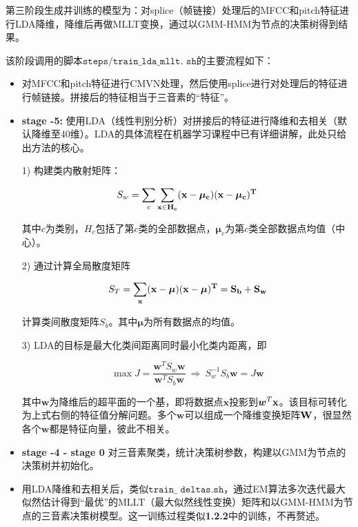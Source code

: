 \documentclass[a4paper]{article}
\renewcommand{\tt}[1]{\mathtt{#1}}
\newcommand{\bd}[1]{\boldsymbol{#1}}
\begin{document}
第三阶段生成并训练的模型为：对splice（帧链接）处理后的MFCC和pitch特征进行LDA降维，降维后再做MLLT变换，通过以GMM-HMM为节点的决策树得到结果。

\vspace{1em}
该阶段调用的脚本$\tt{steps/train\_lda\_mllt.}$ $\tt{sh}$的主要流程如下：

\begin{itemize}
    \item 对MFCC和pitch特征进行CMVN处理，然后使用splice进行对处理后的特征进行帧链接。拼接后的特征相当于三音素的“特征”。
    \item \textbf{stage -5:} 使用LDA（线性判别分析）对拼接后的特征进行降维和去相关（默认降维至40维）。LDA的具体流程在机器学习课程\cite{ML}中已有详细讲解，此处只给出方法的核心。
    
    1) 构建类内散射矩阵：
    
    \vspace{-0.5em}
    $$S_w=\sum_{c}\sum_{\bf{x}\in H_c}(\bf{x}-\bd{\mu}_c)(\bf{x}-\bd{\mu}_c)^T$$
    
    其中$c$为类别，$H_c$包括了第$c$类的全部数据点，$\bd{\mu}_c$为第$c$类全部数据点均值（中心）。
    
    2) 通过计算全局散度矩阵
    
    \vspace{-2em}
    $$S_T=\sum_{\bf{x}}(\bf{x}-\bd{\mu})(\bf{x}-\bd{\mu})^T=S_b+S_w$$
    
    \vspace{-1em}
    计算类间散度矩阵$S_b$。其中$\bd{\mu}$为所有数据点的均值。
    
    3) LDA的目标是最大化类间距离同时最小化类内距离，即
    
    \vspace{-1.5em}
    $$\max J=\frac{\bd{w}^TS_w\bd{w}}{\bd{w}^TS_b\bd{w}}\ \Longrightarrow\ S_w^{-1}S_b\bd{w}=J\bd{w}$$
    
    其中$\bd{w}$为降维后的超平面的一个基，即将数据点$\bd{x}$投影到$\bd{w}^T\bf{x}$。该目标可转化为上式右侧的特征值分解问题。多个$\bd{w}$可以组成一个降维变换矩阵$\bf{W}$，很显然各个$\bd{w}$都是特征向量，彼此不相关。
    
    \item \textbf{stage -4 - stage 0} 
    对三音素聚类，统计决策树参数，构建以GMM为节点的决策树并初始化。
    
    \item 用LDA降维和去相关后，类似$\tt{train\_}$ $\tt{deltas.sh}$，通过EM算法多次迭代最大似然估计得到“最优”的MLLT（最大似然线性变换）矩阵\cite{LDA}和以GMM-HMM为节点的三音素决策树模型。这一训练过程类似\textbf{1.2.2}中的训练，不再赘述。
    

\end{itemize}
\end{document}
